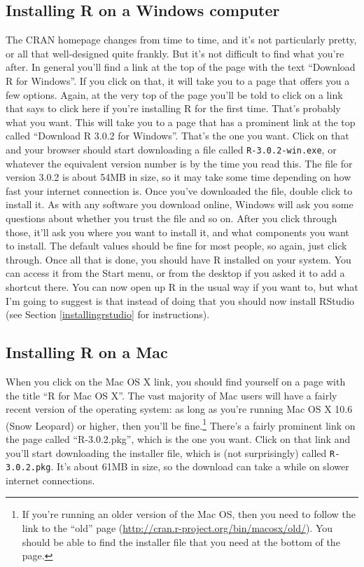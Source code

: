 \documentclass[
]{book}
\begin{document}
\hypertarget{installing-r-on-a-windows-computer}{%
\subsection{Installing R on a Windows computer}\label{installing-r-on-a-windows-computer}}

The CRAN homepage changes from time to time, and it's not particularly pretty, or all that well-designed quite frankly. But it's not difficult to find what you're after. In general you'll find a link at the top of the page with the text ``Download R for Windows''. If you click on that, it will take you to a page that offers you a few options. Again, at the very top of the page you'll be told to click on a link that says to click here if you're installing R for the first time. That's probably what you want. This will take you to a page that has a prominent link at the top called ``Download R 3.0.2 for Windows''. That's the one you want. Click on that and your browser should start downloading a file called \texttt{R-3.0.2-win.exe}, or whatever the equivalent version number is by the time you read this. The file for version 3.0.2 is about 54MB in size, so it may take some time depending on how fast your internet connection is. Once you've downloaded the file, double click to install it. As with any software you download online, Windows will ask you some questions about whether you trust the file and so on. After you click through those, it'll ask you where you want to install it, and what components you want to install. The default values should be fine for most people, so again, just click through. Once all that is done, you should have R installed on your system. You can access it from the Start menu, or from the desktop if you asked it to add a shortcut there. You can now open up R in the usual way if you want to, but what I'm going to suggest is that instead of doing that you should now install RStudio (see Section \ref{installingrstudio} for instructions).

\hypertarget{installing-r-on-a-mac}{%
\subsection{Installing R on a Mac}\label{installing-r-on-a-mac}}

When you click on the Mac OS X link, you should find yourself on a page with the title ``R for Mac OS X''. The vast majority of Mac users will have a fairly recent version of the operating system: as long as you're running Mac OS X 10.6 (Snow Leopard) or higher, then you'll be fine.\footnote{If you're running an older version of the Mac OS, then you need to follow the link to the ``old'' page (\url{http://cran.r-project.org/bin/macosx/old/}). You should be able to find the installer file that you need at the bottom of the page.} There's a fairly prominent link on the page called ``R-3.0.2.pkg'', which is the one you want. Click on that link and you'll start downloading the installer file, which is (not surprisingly) called \texttt{R-3.0.2.pkg}. It's about 61MB in size, so the download can take a while on slower internet connections.
\end{document}
